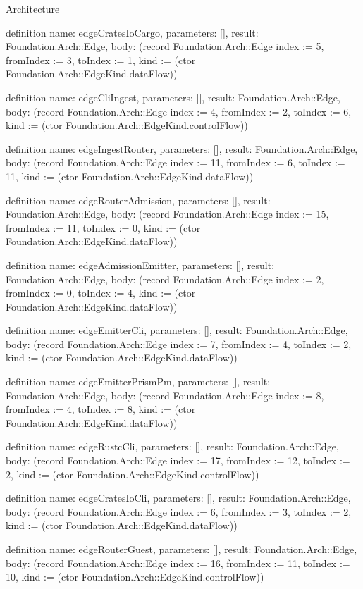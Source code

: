 \begin{lexlean}{Architecture}
\begin{semanticmodule}
definition{
  name: edgeCratesIoCargo,
  parameters: [],
  result: Foundation.Arch::Edge,
  body: (record Foundation.Arch::Edge {index := 5, fromIndex := 3, toIndex := 1, kind := (ctor Foundation.Arch::EdgeKind.dataFlow)})
}

definition{
  name: edgeCliIngest,
  parameters: [],
  result: Foundation.Arch::Edge,
  body: (record Foundation.Arch::Edge {index := 4, fromIndex := 2, toIndex := 6, kind := (ctor Foundation.Arch::EdgeKind.controlFlow)})
}

definition{
  name: edgeIngestRouter,
  parameters: [],
  result: Foundation.Arch::Edge,
  body: (record Foundation.Arch::Edge {index := 11, fromIndex := 6, toIndex := 11, kind := (ctor Foundation.Arch::EdgeKind.dataFlow)})
}

definition{
  name: edgeRouterAdmission,
  parameters: [],
  result: Foundation.Arch::Edge,
  body: (record Foundation.Arch::Edge {index := 15, fromIndex := 11, toIndex := 0, kind := (ctor Foundation.Arch::EdgeKind.dataFlow)})
}

definition{
  name: edgeAdmissionEmitter,
  parameters: [],
  result: Foundation.Arch::Edge,
  body: (record Foundation.Arch::Edge {index := 2, fromIndex := 0, toIndex := 4, kind := (ctor Foundation.Arch::EdgeKind.dataFlow)})
}

definition{
  name: edgeEmitterCli,
  parameters: [],
  result: Foundation.Arch::Edge,
  body: (record Foundation.Arch::Edge {index := 7, fromIndex := 4, toIndex := 2, kind := (ctor Foundation.Arch::EdgeKind.dataFlow)})
}

definition{
  name: edgeEmitterPrismPm,
  parameters: [],
  result: Foundation.Arch::Edge,
  body: (record Foundation.Arch::Edge {index := 8, fromIndex := 4, toIndex := 8, kind := (ctor Foundation.Arch::EdgeKind.dataFlow)})
}

definition{
  name: edgeRustcCli,
  parameters: [],
  result: Foundation.Arch::Edge,
  body: (record Foundation.Arch::Edge {index := 17, fromIndex := 12, toIndex := 2, kind := (ctor Foundation.Arch::EdgeKind.controlFlow)})
}

definition{
  name: edgeCratesIoCli,
  parameters: [],
  result: Foundation.Arch::Edge,
  body: (record Foundation.Arch::Edge {index := 6, fromIndex := 3, toIndex := 2, kind := (ctor Foundation.Arch::EdgeKind.dataFlow)})
}

definition{
  name: edgeRouterGuest,
  parameters: [],
  result: Foundation.Arch::Edge,
  body: (record Foundation.Arch::Edge {index := 16, fromIndex := 11, toIndex := 10, kind := (ctor Foundation.Arch::EdgeKind.controlFlow)})
}


\end{semanticmodule}
\end{lexlean}
